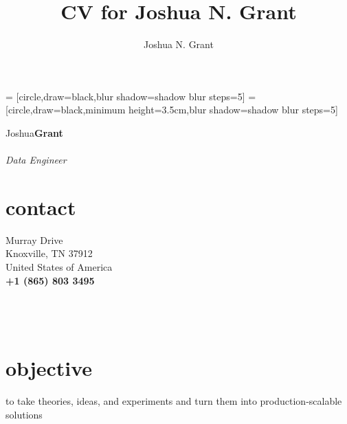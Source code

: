 \documentclass[10pt]{article}%
\author{Joshua N. Grant}
\title{CV for Joshua N. Grant}
\begin{document}
%
 = [circle,draw=black,blur shadow={shadow blur steps=5}]%
 = [circle,draw=black,minimum height=3.5cm,blur shadow={shadow blur steps=5}]%
\begin{minipage}[ht]{.25\linewidth}%
  \setlength{\headsep}{-10pt}
  \setlength{\voffset}{-0.75in}
   {\Large Joshua\huge\textbf{Grant}} \\ \\
   {\large \textit{Data Engineer}}
   \section*{\faUser{} contact}%
      Murray Drive \\
     Knoxville, TN 37912 \\
     United States of America  \\
     \textbf{+1 (865) 803 3495} \faMobile \\
     \href{mailto:jngrant9@gmail.com}{\color{linkcolor}{jngrant9@gmail.com \faEnvelope}} \\
     \href{http://notjustadatum.blogspot.com}{\color{linkcolor}{notjustadatum.blogspot.com \faBold}} \\
     \href{http://github.com/sempervent}{\color{linkcolor}{github.com/sempervent \faGithubAlt}} \\
     \href{https://www.linkedin.com/in/joshua-grant-a3842968/}{\color{linkcolor}{\small linkedin.com/in/joshuanagrant} \faLinkedin}
     \flushleft%
   \section*{\faBullseye{} objective}%
   \flushright
   to take theories, ideas, and experiments and turn them into production-scalable solutions
   \flushleft

\end{minipage}
\end{document}
